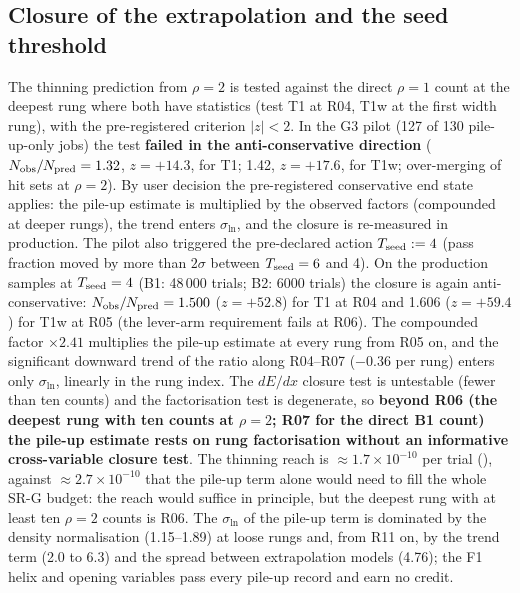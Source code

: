 \subsection{Closure of the extrapolation and the seed threshold}\label{sec:bkg:closure}
The thinning prediction from $\rho=2$ is tested against the direct $\rho=1$ count at the deepest rung where both have
statistics (test T1 at R04, T1w at the first width rung), with the pre-registered criterion $|z|<2$. In the G3 pilot
(127 of 130 pile-up-only jobs) the test \textbf{failed in the anti-conservative direction} ($N_{\rm obs}/N_{\rm pred}=1.32$,
$z=+14.3$, for T1; 1.42, $z=+17.6$, for T1w; over-merging of hit sets at $\rho=2$). By user decision the pre-registered
conservative end state applies: the pile-up estimate is multiplied by the observed factors (compounded at deeper rungs),
the trend enters $\sigma_{\ln}$, and the closure is re-measured in production. The pilot also triggered the pre-declared
action $T_{\rm seed}:=4$ (pass fraction moved by more than $2\sigma$ between $T_{\rm seed}=6$ and 4).
On the production samples at $T_{\rm seed}=4$ (B1: 48\,000 trials; B2: 6000 trials) the closure is again
anti-conservative: $N_{\rm obs}/N_{\rm pred}=1.500$ ($z=+52.8$) for T1 at R04 and 1.606 ($z=+59.4$) for T1w at R05 (the
lever-arm requirement fails at R06). The compounded factor $\times2.41$ multiplies the pile-up estimate at every rung
from R05 on, and the significant downward trend of the ratio along R04--R07 ($-0.36$ per rung) enters only
$\sigma_{\ln}$, linearly in the rung index. The $dE/dx$ closure test is untestable (fewer than ten counts) and the
factorisation test is degenerate, so \textbf{beyond R06 (the deepest rung with ten counts at $\rho=2$; R07 for the direct
B1 count) the pile-up estimate rests on rung factorisation without an informative cross-variable closure test}. The
thinning reach is $\approx1.7\times10^{-10}$ per trial (\EST{}), against $\approx2.7\times10^{-10}$ that the pile-up term
alone would need to fill the whole SR-G budget: the reach would suffice in principle, but the deepest rung with at least
ten $\rho=2$ counts is R06. The $\sigma_{\ln}$ of the pile-up term is dominated by the density
normalisation (1.15--1.89) at loose rungs and, from R11 on, by the trend term (2.0 to 6.3) and the spread between
extrapolation models (4.76); the F1 helix and opening variables pass every pile-up record and earn no credit.

